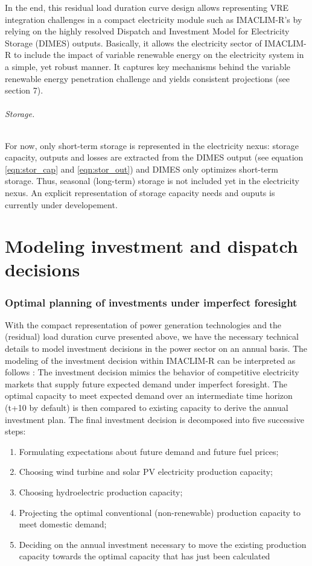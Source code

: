 In the end, this residual load duration curve design allows representing VRE integration challenges in a compact electricity module such as IMACLIM-R's by relying on the highly resolved Dispatch and Investment Model for Electricity Storage (DIMES)  outputs. Basically, it allows the electricity sector of IMACLIM-R to include the impact of variable renewable energy on the electricity system in a simple, yet robust manner. It captures key mechanisms behind the variable renewable energy penetration challenge and yields consistent projections (see section 7).

\paragraph*{Storage.}
For now, only short-term storage is represented in the electricity nexus: storage capacity, outputs and losses are extracted from the DIMES output (see equation \ref{eqn:stor_cap} and \ref{eqn:stor_out}) and DIMES only optimizes short-term storage. Thus, seasonal (long-term) storage is not included yet in the electricity nexus. An explicit representation of storage capacity needs and ouputs is currently under developement.

\part*{Modeling investment and dispatch decisions}

\section{Optimal planning of investments under imperfect foresight}

With the compact representation of power generation technologies and the (residual) load duration curve presented above, we have the necessary technical details to model investment decisions in the power sector on an annual basis.
The modeling of the investment decision within IMACLIM-R can be interpreted as follows : The investment decision mimics the behavior of competitive electricity markets that supply future expected demand under imperfect foresight. The optimal capacity to meet expected demand over an intermediate time horizon (t+10 by default) is then compared to existing capacity to derive the annual investment plan.
The final investment decision is decomposed into five successive steps:
\begin{enumerate}
    \item Formulating expectations about future demand and future fuel prices;
    \item Choosing  wind turbine and solar PV  electricity production capacity;
    \item Choosing hydroelectric production capacity;
    \item Projecting the optimal conventional (non-renewable) production capacity to meet domestic demand;
    \item Deciding on the annual investment necessary to move the existing production capacity towards the optimal capacity that has just been calculated
\end{enumerate}

